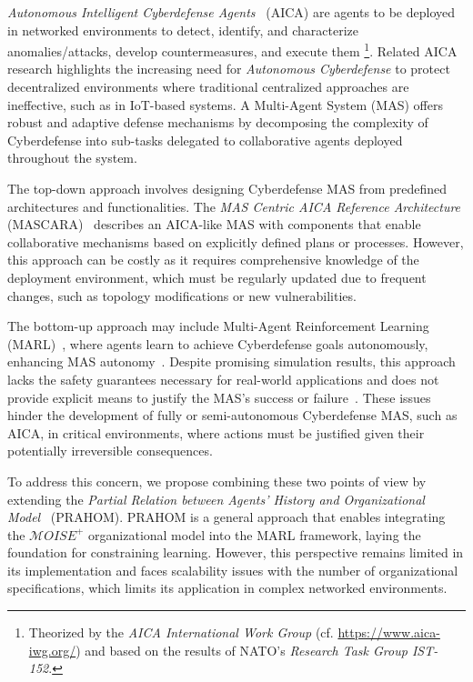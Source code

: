 \documentclass[a4paper,twoside]{article}
\begin{document}
\textit{Autonomous Intelligent Cyberdefense Agents}~\cite{Kott2023} (AICA) are agents to be deployed in networked environments to detect, identify, and characterize anomalies/attacks, develop countermeasures, and execute them
%
\footnote{
    Theorized by the \textit{AICA International Work Group} (cf. \url{https://www.aica-iwg.org/}) and based on the results of NATO's \textit{Research Task Group IST-152}.
}.
Related AICA research highlights the increasing need for \textit{Autonomous Cyberdefense} to protect decentralized environments where traditional centralized approaches are ineffective, such as in IoT-based systems. A Multi-Agent System (MAS) offers robust and adaptive defense mechanisms by decomposing the complexity of Cyberdefense into sub-tasks delegated to collaborative agents deployed throughout the system.

The top-down approach involves designing Cyberdefense MAS from predefined architectures and functionalities. The \textit{MAS Centric AICA Reference Architecture} (MASCARA)~\cite{Kott2023} describes an AICA-like MAS with components that enable collaborative mechanisms based on explicitly defined plans or processes. However, this approach can be costly as it requires comprehensive knowledge of the deployment environment, which must be regularly updated due to frequent changes, such as topology modifications or new vulnerabilities.

The bottom-up approach may include Multi-Agent Reinforcement Learning (MARL)~\cite{Albrecht2024}, where agents learn to achieve Cyberdefense goals autonomously, enhancing MAS autonomy~\cite{hammar_stadle4_noms_23}. Despite promising simulation results, this approach lacks the safety guarantees necessary for real-world applications and does not provide explicit means to justify the MAS's success or failure~\cite{dulacarnold2019}. These issues hinder the development of fully or semi-autonomous Cyberdefense MAS, such as AICA, in critical environments, where actions must be justified given their potentially irreversible consequences.

To address this concern, we propose combining these two points of view by extending the \textit{Partial Relation between Agents' History and Organizational Model}~\cite{soule2024} (PRAHOM). PRAHOM is a general approach that enables integrating the $\mathcal{M}OISE^+$ organizational model into the MARL framework, laying the foundation for constraining learning. However, this perspective remains limited in its implementation and faces scalability issues with the number of organizational specifications, which limits its application in complex networked environments.
\end{document}
